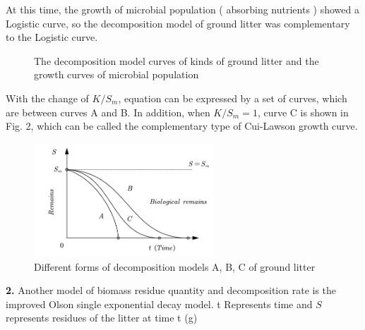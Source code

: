 \documentclass{mcmthesis}
\begin{document}
At this time, the growth of microbial population ( absorbing nutrients ) showed a Logistic curve, so the decomposition model of ground litter was complementary to the Logistic curve. 
\begin{figure}[H]
	\centering
	\quad
	\caption{The decomposition model curves of kinds of ground litter and the growth curves of microbial population}
	\label{fig:jiago}
\end{figure} 

With the change of $K/S_m$, equation can be expressed by a set of curves, which are between curves A and B. In addition, when $K/S_m=1$, curve C is shown in Fig. 2, which can be called the complementary type of Cui-Lawson growth curve.
\begin{figure}[H]
	\centering
	\includegraphics[width=0.6\textwidth]{img/3种不同的曲线.png}
	\caption{Different forms of decomposition models A, B, C of ground litter}\label{fig:3种不同的曲线}
\end{figure}
\textbf{2.} \quad Another model of biomass residue quantity and decomposition rate is the improved Olson single exponential decay model. t Represents time and $S$ represents residues of the litter at time t (g)
\end{document}

